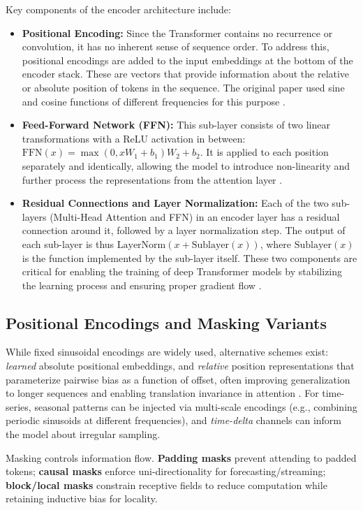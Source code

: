 Key components of the encoder architecture include:
\begin{itemize}
    \item \textbf{Positional Encoding:} Since the Transformer contains no recurrence or convolution, it has no inherent sense of sequence order. To address this, positional encodings are added to the input embeddings at the bottom of the encoder stack. These are vectors that provide information about the relative or absolute position of tokens in the sequence. The original paper used sine and cosine functions of different frequencies for this purpose \citep{vaswani2017attention}.
    \item \textbf{Feed-Forward Network (FFN):} This sub-layer consists of two linear transformations with a ReLU activation in between: \(\text{FFN}(x) = \max(0, xW_1 + b_1)W_2 + b_2\). It is applied to each position separately and identically, allowing the model to introduce non-linearity and further process the representations from the attention layer \citep{vaswani2017attention}.
    \item \textbf{Residual Connections and Layer Normalization:} Each of the two sub-layers (Multi-Head Attention and FFN) in an encoder layer has a residual connection around it, followed by a layer normalization step. The output of each sub-layer is thus \(\text{LayerNorm}(x + \text{Sublayer}(x))\), where \(\text{Sublayer}(x)\) is the function implemented by the sub-layer itself. These two components are critical for enabling the training of deep Transformer models by stabilizing the learning process and ensuring proper gradient flow \citep{ba2016layer}.
\end{itemize}

\subsection{Positional Encodings and Masking Variants}
While fixed sinusoidal encodings are widely used, alternative schemes exist: \emph{learned} absolute positional embeddings, and \emph{relative} position representations that parameterize pairwise bias as a function of offset, often improving generalization to longer sequences and enabling translation invariance in attention \citep{shaw2018self}. For time-series, seasonal patterns can be injected via multi-scale encodings (e.g., combining periodic sinusoids at different frequencies), and \emph{time-delta} channels can inform the model about irregular sampling.\par
Masking controls information flow. \textbf{Padding masks} prevent attending to padded tokens; \textbf{causal masks} enforce uni-directionality for forecasting/streaming; \textbf{block/local masks} constrain receptive fields to reduce computation while retaining inductive bias for locality.

